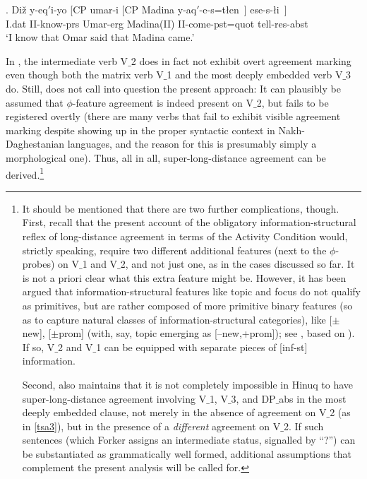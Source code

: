 \documentclass[output=paper
,modfonts
,nonflat]{langsci/langscibook}
\begin{document}
\exig. Di\v{z} \label{tsa3}y-eq$'$i-yo [CP \textglotstop umar-i [CP Madina
    y-aq$'$-e-s=t\l en~] ese-s-\l i~]\\
I.{\sc dat} II-know-{\sc prs} {} Umar-{\sc erg} {} Madina(II)
II-come-{\sc pst}={\sc quot} tell-{\sc res}-{\sc abst}\\
`I know that Omar said that Madina came.'

In \Last, the intermediate verb V$\_$2 does in fact not exhibit overt
agreement marking even though both the matrix verb V$\_$1 and the most
deeply embedded verb V$\_$3 do. Still, \Last does not call into question
the present approach: It can plausibly be assumed that $\phi$-feature
agreement is indeed present on V$\_$2, but fails to be registered overtly
(there are many verbs that fail to exhibit visible agreement marking
despite showing up in the proper syntactic context in
Nakh-Daghestanian languages, and the reason for this is presumably
simply a morphological one). Thus, all in all, super-long-distance
agreement can be derived.\footnote{It should be mentioned that there
  are two further complications, though. First, recall that the
  present account of the obligatory information-structural reflex of
  long-distance agreement in terms of the Activity Condition would,
  strictly speaking, require two different additional features (next
  to the $\phi$-probes) on V$\_$1 and V$\_$2, and not just one, as in the
  cases discussed so far. It is not a priori clear what
  this extra feature might be. However, it has been argued that
  information-structural features like topic and focus do not qualify
  as primitives, but are rather composed of more primitive binary
  features (so as to capture natural classes of information-structural
  categories), like [$\pm$new], [$\pm$prom] (with, say, topic emerging
  as [--new,+prom]); see \cite{Choi:99}, based on
  \cite{Vallduvi:92}). If so, V$\_$2 and V$\_$1 can be equipped with
  separate pieces of [inf-st] information.

Second, \cite{Forker:11} also maintains that it is not completely
impossible in Hinuq to have super-long-distance agreement involving
V$\_$1, V$\_$3, and DP$\_${abs} in the most deeply embedded clause, not merely
in the absence of agreement on V$\_$2 (as in \ref{tsa3}), but in the presence of a {\it
  different} agreement on V$\_$2.  If such sentences (which  Forker assigns
an intermediate status, signalled by ``?'') can be substantiated as
grammatically well formed, additional assumptions that complement the
present analysis will be called for.}
\end{document}
